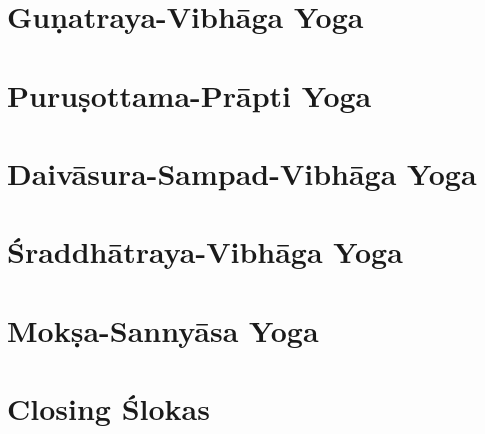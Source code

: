 \documentclass{scrbook}
\begin{document}
\chapter{Guṇatraya-Vibhāga Yoga}


\chapter{Puruṣottama-Prāpti Yoga}


\chapter{Daivāsura-Sampad-Vibhāga Yoga}


\chapter{Śraddhātraya-Vibhāga Yoga}


\chapter{Mokṣa-Sannyāsa Yoga}


\backmatter
\chapter{Closing Ślokas}

\end{document}
